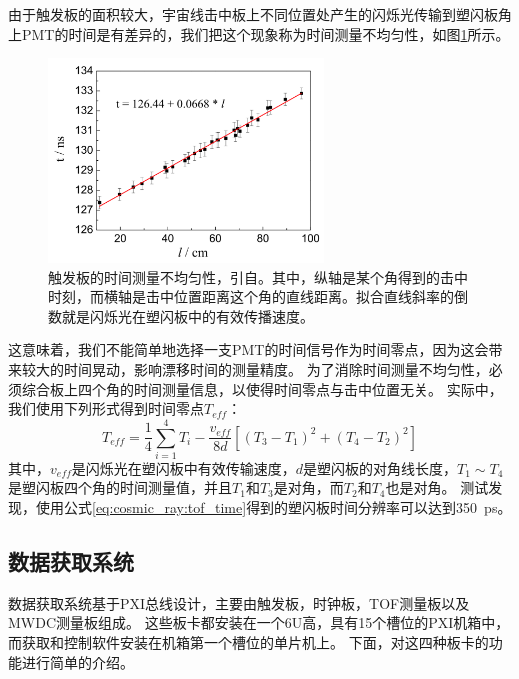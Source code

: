 由于触发板的面积较大，宇宙线击中板上不同位置处产生的闪烁光传输到塑闪板角上PMT的时间是有差异的，我们把这个现象称为时间测量不均匀性，如图\ref{fig:cosmic_ray:tof_timeVSposition}所示。
\begin{figure}[htbp]
	\centering
	\includegraphics[width=0.65\textwidth]{chap/cosmic_ray/fig/tof_timeVSposition.png}
	\caption{触发板的时间测量不均匀性，引自\parencite{tang_large_2015}。其中，纵轴是某个角得到的击中时刻，而横轴是击中位置距离这个角的直线距离。拟合直线斜率的倒数就是闪烁光在塑闪板中的有效传播速度。}
	\label{fig:cosmic_ray:tof_timeVSposition}
\end{figure}
这意味着，我们不能简单地选择一支PMT的时间信号作为时间零点，因为这会带来较大的时间晃动，影响漂移时间的测量精度。
为了消除时间测量不均匀性，必须综合板上四个角的时间测量信息，以使得时间零点与击中位置无关。
实际中，我们使用下列形式\parencite{annand_large_1987}得到时间零点$T_{eff}$：
\begin{equation}
	T_{eff} = \frac{1}{4}\sum^4_{i=1}T_i - \frac{v_{eff}}{8d}[(T_3-T_1)^2+(T_4-T_2)^2]
	\label{eq:cosmic_ray:tof_time}
\end{equation}
其中，$v_{eff}$是闪烁光在塑闪板中有效传输速度，$d$是塑闪板的对角线长度，$T_1\sim T_4$是塑闪板四个角的时间测量值，并且$T_1$和$T_3$是对角，而$T_2$和$T_4$也是对角。
测试发现，使用公式\ref{eq:cosmic_ray:tof_time}得到的塑闪板时间分辨率可以达到\SI{350}{\pico\second}\parencite{tang_large_2015}。

\subsection{数据获取系统}
\label{sec:cosmic_ray:daq_system}
数据获取系统基于PXI总线设计，主要由触发板，时钟板，TOF测量板以及MWDC测量板组成\parencite{kanglongfei_thesis,zhoujiawen_thesis}。
这些板卡都安装在一个6U高，具有15个槽位的PXI机箱中\parencite{pxi_chassis}，而获取和控制软件安装在机箱第一个槽位的单片机上。
下面，对这四种板卡的功能进行简单的介绍。

